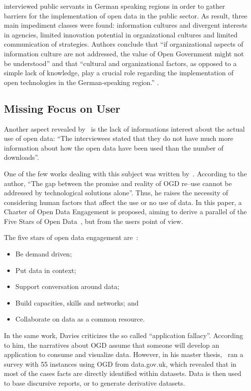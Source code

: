  interviewed public servants in German speaking regions in order to gather barriers for the implementation of open data in the public sector.
As result, three main impediment classes were found: information cultures and divergent interests in agencies, limited innovation potential in organizational cultures and limited communication of strategies.
Authors conclude that ``if organizational aspects of information culture are not addressed, the value of Open Government might not be understood'' and that ``cultural and organizational factors, as opposed to a simple lack of knowledge, play a crucial role regarding the implementation of open technologies in the German-speaking region.'' \cite[p.7]{Parycek2016}.

\subsection{Missing Focus on User}

Another aspect revealed by~ is the lack of informations interest about the actual use of open data: ``The interviewees stated that they do not have much more information about how the open data have been used than the number of downloads''.

One of the few works dealing with this subject was written by~. According to the author, ``The gap between the promise and reality of OGD re--use cannot be addressed by technological solutions alone''.
Thus, he raises the necessity of considering human factors that affect the use or no use of data.
In this paper, a Charter of Open Data Engagement is proposed, aiming to derive a parallel of the Five Stars of Open Data~\cite{Berners-Lee2010}, but from the users point of view.

The five stars of open data engagement are~\cite{Davies2012}:

\begin{itemize}
	\item Be demand driven;
	\item Put data in context;
	\item Support conversation around data;
	\item Build capacities, skills and networks; and
	\item Collaborate on data as a common resource.
\end{itemize}

In the same work, Davies criticizes the so called ``application fallacy''.
According to him, the narratives about OGD assume that someone will develop an application to consume and visualize data.
However, in his master thesis,~ ran a survey with 55 instances using OGD from data.gov.uk, which revealed that in most of the cases facts are directly identified within datasets.
Data is then used to base discursive reports, or to generate derivative datasets.

